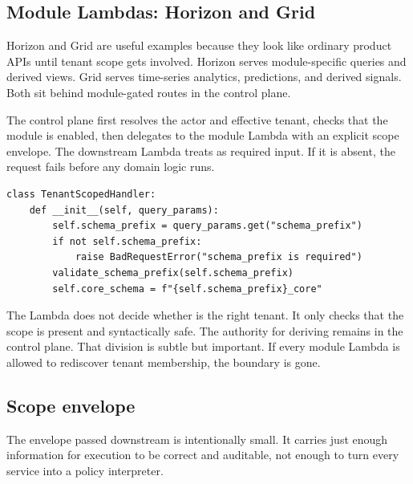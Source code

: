 \subsection{Module Lambdas: Horizon and Grid}

Horizon and Grid are useful examples because they look like ordinary product APIs until tenant scope gets involved. Horizon serves module-specific queries and derived views. Grid serves time-series analytics, predictions, and derived signals. Both sit behind module-gated routes in the control plane.

The control plane first resolves the actor and effective tenant, checks that the module is enabled, then delegates to the module Lambda with an explicit scope envelope. The downstream Lambda treats \scopeprefix{} as required input. If it is absent, the request fails before any domain logic runs.

\begin{lstlisting}[style=python, caption={Simplified module Lambda scope check.}]
class TenantScopedHandler:
    def __init__(self, query_params):
        self.schema_prefix = query_params.get("schema_prefix")
        if not self.schema_prefix:
            raise BadRequestError("schema_prefix is required")
        validate_schema_prefix(self.schema_prefix)
        self.core_schema = f"{self.schema_prefix}_core"
\end{lstlisting}

The Lambda does not decide whether  is the right tenant. It only checks that the scope is present and syntactically safe. The authority for deriving  remains in the control plane. That division is subtle but important. If every module Lambda is allowed to rediscover tenant membership, the boundary is gone.

\subsection{Scope envelope}

The envelope passed downstream is intentionally small. It carries just enough information for execution to be correct and auditable, not enough to turn every service into a policy interpreter.

